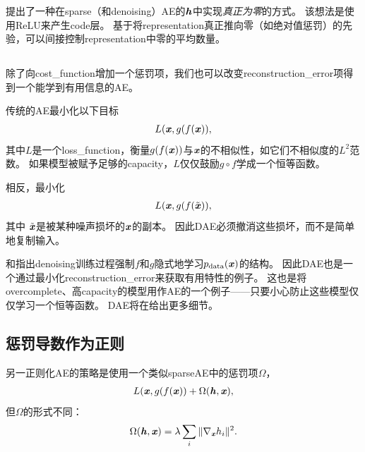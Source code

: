 \citet{Glorot+al-ICML-2011-small}提出了一种在\gls{sparse}（和\gls{denoising}）\gls{AE}的$\boldsymbol{\mathit{h}}$中实现\emph{真正为零}的方式。
该想法是使用\gls{ReLU}来产生\gls{code}层。
基于将\gls{representation}真正推向零（如绝对值惩罚）的先验，可以间接控制\gls{representation}中零的平均数量。



\subsection{}
\label{sec:sub_denoising_autoencoders}
除了向\gls{cost_function}增加一个惩罚项，我们也可以改变\gls{reconstruction_error}项得到一个能学到有用信息的\gls{AE}。


传统的\gls{AE}最小化以下目标
\begin{align}
L(\boldsymbol{\mathit{x}}, g(f(\boldsymbol{\mathit{x}})),
\end{align}
其中$L$是一个\gls{loss_function}，衡量$g(f(\boldsymbol{\mathit{x}}))$与$\boldsymbol{\mathit{x}}$的不相似性，如它们不相似度的$L^2$范数。
如果模型被赋予足够的\gls{capacity}，$L$仅仅鼓励$g \circ  f$学成一个恒等函数。


相反，最小化 
\begin{align}
L(\boldsymbol{\mathit{x}}, g(f(\tilde {\boldsymbol{\mathit{x}}})),
\end{align}
其中 $\tilde {\boldsymbol{\mathit{x}}}$是被某种噪声损坏的$\boldsymbol{\mathit{x}}$的副本。
因此\gls{DAE}必须撤消这些损坏，而不是简单地复制输入。

\citet{Alain+Bengio-ICLR2013-small}和\citet{Bengio-et-al-NIPS2013-small}指出\gls{denoising}训练过程强制$f$和$g$隐式地学习$p_{\text{data}} (\boldsymbol{\mathit{x}})$的结构。
因此\gls{DAE}也是一个通过最小化\gls{reconstruction_error}来获取有用特性的例子。
这也是将\gls{overcomplete}、高\gls{capacity}的模型用作\gls{AE}的一个例子——只要小心防止这些模型仅仅学习一个恒等函数。
\gls{DAE}将在给出更多细节。


\subsection{惩罚导数作为正则}
\label{sec:regularizing_by_penalizing_derivatives}
另一正则化\gls{AE}的策略是使用一个类似\gls{sparse}\gls{AE}中的惩罚项$\Omega$，
\begin{align}
L(\boldsymbol{\mathit{x}}, g(f(\boldsymbol{\mathit{x}})) + \Omega(\boldsymbol{\mathit{h}}, \boldsymbol{\mathit{x}}),
\end{align}
但$\Omega$的形式不同：
\begin{align}
\Omega(\boldsymbol{\mathit{h}}, \boldsymbol{\mathit{x}}) = \lambda \sum_i \| \nabla_{\boldsymbol{\mathit{x}}}h_i \|^2.
\end{align}


